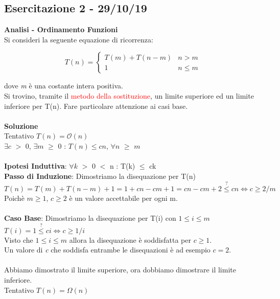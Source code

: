 \documentclass[../cheatSheetAlgoritmi.tex]{subfiles}
\begin{document}
\subsection{Esercitazione 2 - 29/10/19}
\textbf{Analisi - Ordinamento Funzioni}\\
Si consideri la seguente equazione di ricorrenza:
\begin{center}
	\begin{equation*}
  		T(n)=\begin{cases}
			T(m) +  T(n - m) & \text{$n > m$}\\
			1 & \text{$n \leq m$}	
  		\end{cases}
	\end{equation*}
\end{center}
dove \textit{m} è una costante intera positiva.\\
Si trovino, tramite il \textcolor{red}{metodo della sostituzione}, un limite superiore ed un limite inferiore per T(n). Fare particolare attenzione ai casi base.\\\\
\textbf{Soluzione}\\
Tentativo $T(n) = \mathcal{O}(n)$\\
$\exists c$ $>$ 0, $\exists m$ $\geq$ 0 : $T(n) \leq cn$, $\forall n$ $\geq$ $m$\\\\
\textbf{Ipotesi Induttiva}: $\forall k$ $>$ 0 $<$ n : T(k) $\leq$ ck\\
\textbf{Passo di Induzione}: Dimostriamo la disequazione per T(n)\\
$T(n) = T(m) + T(n-m) + 1 = 1 + cn - cm + 1 = cn - cm + 2 \stackrel{?}{\leq} cn \iff c \geq 2/m$\\
Poichè $m \geq 1$, $c \geq 2$ è un valore accettabile per ogni m.\\\\
\textbf{Caso Base}: Dimostriamo la disequazione per T(i) con $1 \leq i \leq m$\\
$T(i) = 1 \stackrel{?}{\leq} ci \iff c \geq 1/i$\\
Visto che $1 \leq i \leq m$ allora la disequazione è soddisfatta per $c \geq 1$.\\
Un valore di \textit{c} che soddisfa entrambe le disequazioni è ad esempio $c = 2$.\\\\
Abbiamo dimostrato il limite superiore, ora dobbiamo dimostrare il limite inferiore.\\
Tentativo $T(n) = \Omega(n)$\\
\end{document}
